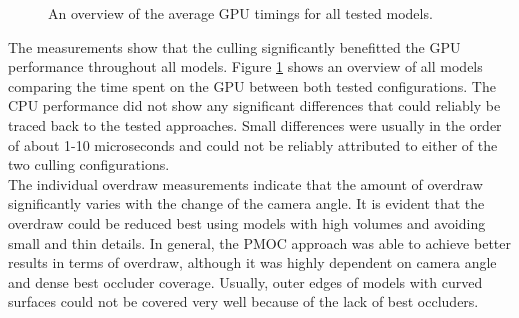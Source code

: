 \begin{figure}    %
  \begin{center}
  \end{center}
  \caption{An overview of the average \ac{GPU} timings for all tested models.}
  \label{fig:gpu-performance-overview}
\end{figure}

\noindent
The measurements show that the culling significantly benefitted the \ac{GPU} performance throughout all 
models. Figure \ref{fig:gpu-performance-overview} shows an overview of all models comparing the time spent 
on the \ac{GPU} between both tested configurations. The \ac{CPU} performance did not show any significant 
differences that could reliably be traced back to the tested approaches. Small differences were usually in the 
order of about 1-10 microseconds and could not be reliably attributed to either of the two culling 
configurations. \\


\noindent
The individual overdraw measurements indicate that the amount of overdraw significantly varies with the 
change of the camera angle. It is evident that the overdraw could be reduced best using models with high 
volumes and avoiding small and thin details. In general, the \ac{PMOC} approach was able to 
achieve better results in terms of overdraw, although it was highly dependent on camera angle and dense 
best occluder coverage. Usually, outer edges of models with curved surfaces could not be covered very well 
because of the lack of best occluders. \\
